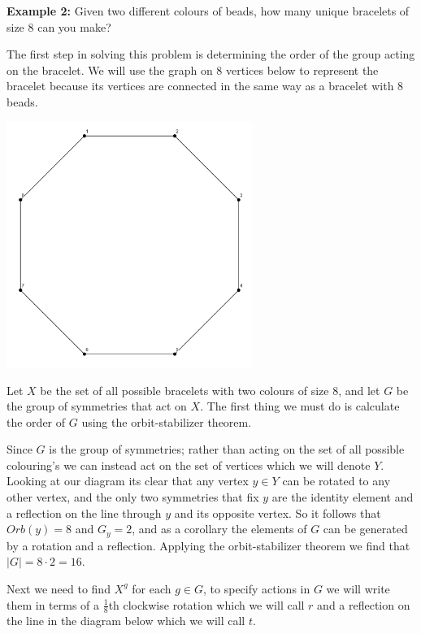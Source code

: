 \documentclass[../main.tex]{subfiles}
\begin{document}
    \textbf{Example 2:} Given two different colours of beads, how many unique bracelets of size 8 can you make?
    
    The first step in solving this problem is determining the order of the group acting on the bracelet. We will use the graph on 8 vertices below to represent the bracelet because its vertices are connected in the same way as a bracelet with 8 beads.

    \begin{center}
    \includegraphics[width=80mm]{images/D8.png}   
    \end{center}

    Let $X$ be the set of all possible bracelets with two colours of size 8, and let $G$ be the group of symmetries that act on $X$. The first thing we must do is calculate the order of $G$ using the orbit-stabilizer theorem.

    Since $G$ is the group of symmetries; rather than acting on the set of all possible colouring's we can instead act on the set of vertices which we will denote $Y$. Looking at our diagram its clear that any vertex $y \in Y$ can be rotated to any other vertex, and the only two symmetries that fix $y$ are the identity element and a reflection on the line through $y$ and its opposite vertex. So it follows that $Orb(y) = 8$ and $G_y = 2$, and as a corollary the elements of $G$ can be generated by a rotation and a reflection. Applying the orbit-stabilizer theorem we find that $\lvert G \rvert = 8 \cdot 2 = 16$. 

    Next we need to find $X^g$ for each $g \in G$, to specify actions in $G$ we will write them in terms of a $\frac{1}{8}$th clockwise rotation which we will call $r$ and a reflection on the line in the diagram below which we will call $t$.
\end{document}
